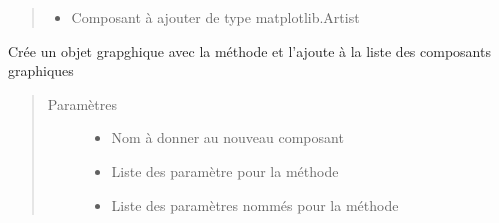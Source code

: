 \documentclass[a4paper,10pt,french]{sphinxmanual}
\begin{document}
\begin{fulllineitems}
\begin{fulllineitems}
\begin{quote}
\begin{description}
\begin{itemize}
\item {} 
 \textendash{} Composant à ajouter de type matplotlib.Artist

\end{itemize}

\end{description}\end{quote}

\end{fulllineitems}


\begin{fulllineitems}
\label{\detokenize{road_objects/graphical_item:road_objects.graphical_item.GraphicalItem.add_plot}}
Crée un objet grapghique avec la méthode  et l’ajoute  à la liste des composants graphiques
\begin{quote}\begin{description}
\item[{Paramètres}] \leavevmode\begin{itemize}
\item {} 
 \textendash{} Nom à donner au nouveau composant

\item {} 
 \textendash{} Liste des paramètre pour la méthode 

\item {} 
 \textendash{} Liste des paramètres nommés pour la méthode 

\end{itemize}

\end{description}\end{quote}

\end{fulllineitems}


\begin{fulllineitems}
\label{\detokenize{road_objects/graphical_item:road_objects.graphical_item.GraphicalItem.ax}}
\end{fulllineitems}


\end{fulllineitems}
\end{document}

